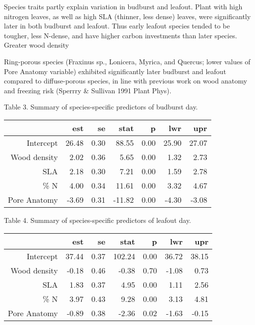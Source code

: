 \documentclass[11pt]{article}
\begin{document}
Species traits partly explain variation in budburst and leafout. Plant with high nitrogen leaves, as well as high SLA (thinner, less dense) leaves, were significantly later in both budburst and leafout. Thus early leafout species tended to be tougher, less N-dense, and have higher carbon investments than later species. Greater wood density

Ring-porous species (Fraxinus sp., Lonicera, Myrica, and Quercus; lower values of Pore Anatomy variable) exhibited significantly later budburst and leafout compared to diffuse-porous species, in line with previous work on wood anatomy and freezing risk (Sperrry & Sullivan 1991 Plant Phys).



Table 3. Summary of species-specific predictors of budburst day. 
\begin{table}[ht]
\centering
\begin{tabular}{rrrrrrr}
  \hline
 & est & se & stat & p & lwr & upr \\ 
  \hline
Intercept & 26.48 & 0.30 & 88.55 & 0.00 & 25.90 & 27.07 \\ 
  Wood density & 2.02 & 0.36 & 5.65 & 0.00 & 1.32 & 2.73 \\ 
  SLA & 2.18 & 0.30 & 7.21 & 0.00 & 1.59 & 2.78 \\ 
  \% N & 4.00 & 0.34 & 11.61 & 0.00 & 3.32 & 4.67 \\ 
  Pore Anatomy & -3.69 & 0.31 & -11.82 & 0.00 & -4.30 & -3.08 \\ 
   \hline
\end{tabular}
\end{table}



Table 4. Summary of species-specific predictors of leafout day. 
\begin{table}[ht]
\centering
\begin{tabular}{rrrrrrr}
  \hline
 & est & se & stat & p & lwr & upr \\ 
  \hline
 Intercept & 37.44 & 0.37 & 102.24 & 0.00 & 36.72 & 38.15 \\ 
  Wood density & -0.18 & 0.46 & -0.38 & 0.70 & -1.08 & 0.73 \\ 
  SLA & 1.83 & 0.37 & 4.95 & 0.00 & 1.11 & 2.56 \\ 
  \% N & 3.97 & 0.43 & 9.28 & 0.00 & 3.13 & 4.81 \\ 
Pore Anatomy & -0.89 & 0.38 & -2.36 & 0.02 & -1.63 & -0.15 \\ 
   \hline
\end{tabular}
\end{table}
\end{document}
